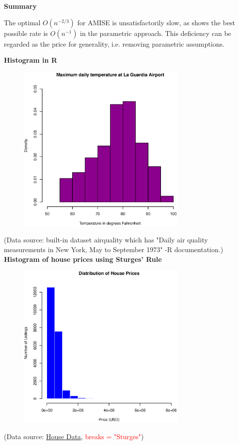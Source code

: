 \documentclass[19pt,landscaoe]{article}
\begin{document}
\newpage
{\LARGE\centerline{\textbf{Summary}}}
\vskip25pt
\begin{minipage}{.9\textwidth}
    \Large 
    The optimal $O(n^{-2/3})$ for AMISE is unsatisfactorily slow, as \cite{boydsteele78} shows the best possible rate is $O(n^{-1})$ in the parametric approach. This deficiency can be regarded as the price for generality, i.e. removing parametric assumptions.  
\end{minipage}


\newpage
{\LARGE{\textbf{Histogram in R}}}
\vskip25pt

\begin{figure}[h]
\centering
      \includegraphics[width=0.75\textwidth,height=0.52\textwidth]{temperature.eps}
    \label{figure5} 
\end{figure}
(Data source: built-in dataset airquality which has "Daily air quality measurements in New York, May to September 1973" -R documentation.)
\newpage
{\LARGE{\textbf{Histogram of house prices using Sturges' Rule}}}
\vskip25pt

\begin{figure}[h]
\centering
      \includegraphics[width=0.75\textwidth,height=0.52\textwidth]{hist_housing_default.eps}
    \label{figure6} 
\end{figure}
(Data source: \href{https://raw.githubusercontent.com/rashida048/Datasets/master/home_data.csv}{House Data}, \textcolor{red}{breaks = "Sturges"})
\end{document}
